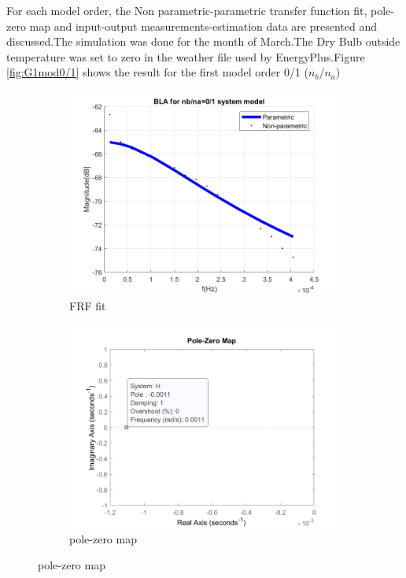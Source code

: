 \documentclass[a4paper,12pt]{article}
\numberwithin{equation}{section}
\begin{document}
\noindent
For each model order, the Non parametric-parametric transfer function fit, pole-zero map and input-output measurements-estimation data  are presented and discussed.The simulation was done for the month of March.The Dry Bulb outside temperature was set to zero in the weather file used by EnergyPlus.Figure \ref{fig:G1mod0/1} shows the result for the first model order 0/1 ($n_{b}$/$n_{a}$)

\begin{figure}[H]
\centering
\begin{subfigure}{.5\textwidth}
  \centering
  \includegraphics[width=.7\linewidth]{G1mod01FrfFit.png}
  \caption{FRF fit}
  \label{fig:frf fit G1mod0/1}
\end{subfigure}%
\begin{subfigure}{.5\textwidth}
  \centering
  \includegraphics[width=.7\linewidth]{G1mod01pzmap.png}
  \caption{pole-zero map}
  \label{fig:pzmap G1mod0/1}
\end{subfigure}


\end{figure}
\end{document}
